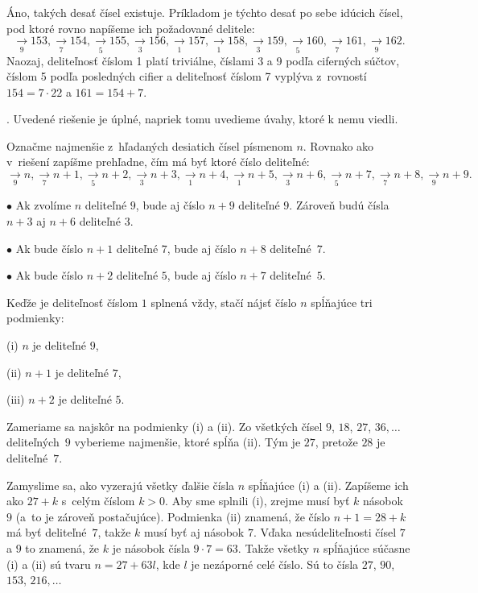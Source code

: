 {%
Áno, takých desať čísel existuje. Príkladom je týchto
desať po sebe
idúcich čísel, pod ktoré rovno napíšeme ich požadované
delitele:
$$
\underset9\to{153}, \underset7\to{154}, \underset5\to{155},
\underset3\to{156}, \underset1\to{157}, \underset1\to{158},
\underset3\to{159}, \underset5\to{160},
\underset7\to{161}, \underset9\to{162}.
$$
Naozaj, deliteľnosť číslom 1 platí triviálne, číslami 3 a 9 podľa
ciferných súčtov, číslom 5 podľa posledných cifier a deliteľnosť
číslom 7 vyplýva z~rovností $154=7\cdot22$ a $161=154+7$.

.
Uvedené riešenie je úplné, napriek tomu uvedieme úvahy, ktoré k nemu viedli.

Označme najmenšie z~hľadaných desiatich čísel písmenom $n$. Rovnako
ako v~riešení zapíšme prehľadne, čím má byť ktoré číslo
deliteľné:
$$
\underset9\to{n}, \underset7\to{n+1}, \underset5\to{n+2},
\underset3\to{n+3}, \underset1\to{n+4}, \underset1\to{n+5},
\underset3\to{n+6}, \underset5\to{n+7},
\underset7\to{n+8}, \underset9\to{n+9}.
$$

\smallskip
\item{$\bullet$} Ak zvolíme $n$ deliteľné $9$, bude aj číslo $n+9$ deliteľné $9$. Zároveň budú čísla $n+3$ aj $n+6$ deliteľné $3$.
\item{$\bullet$} Ak bude číslo $n+1$ deliteľné $7$, bude aj číslo $n+8$ deliteľné~$7$.
\item{$\bullet$} Ak bude číslo $n+2$ deliteľné $5$, bude aj číslo $n+7$ deliteľné~$5$.

\smallskip\noindent
Keďže je deliteľnosť číslom $1$ splnená vždy,
stačí nájsť číslo $n$ spĺňajúce tri podmienky:

\smallskip
\item{(i)} $n$ je deliteľné $9$,
\item{(ii)} $n+1$ je deliteľné $7$,
\item{(iii)} $n+2$ je deliteľné $5$.

\smallskip\noindent
Zameriame sa najskôr na podmienky (i) a (ii). Zo všetkých čísel $9$, $18$,
$27$, $36,\ldots$ deliteľných~$9$ vyberieme najmenšie, ktoré
spĺňa (ii). Tým je $27$, pretože $28$ je deliteľné~$7$.

Zamyslime sa, ako vyzerajú všetky ďalšie čísla $n$ spĺňajúce (i) a (ii).
Zapíšeme ich ako $27+k$ s~celým číslom $k>0$. Aby sme splnili (i),
zrejme musí byť $k$ násobok~$9$ (a~to je zároveň postačujúce). Podmienka (ii)
znamená, že číslo $n+1=28+k$ má byť deliteľné~$7$, takže $k$ musí byť
aj násobok $7$. Vďaka nesúdeliteľnosti čísel $7$ a $9$ to znamená,
že $k$ je násobok čísla $9\cdot7=63$. Takže všetky $n$
spĺňajúce súčasne (i) a (ii) sú tvaru $n=27+63l$, kde $l$ je
nezáporné celé číslo. Sú to čísla $27$, $90$, $153$, $216,\dots$

}
